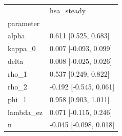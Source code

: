 \begin{tabular}{ll}
\toprule
 & hsa\_steady \\
parameter &  \\
\midrule
alpha & 0.611 [0.525, 0.683] \\
kappa\_0 & 0.007 [-0.093, 0.099] \\
delta & 0.008 [-0.025, 0.026] \\
rho\_1 & 0.537 [0.249, 0.822] \\
rho\_2 & -0.192 [-0.545, 0.061] \\
phi\_1 & 0.958 [0.903, 1.011] \\
lambda\_ez & 0.071 [-0.115, 0.246] \\
n & -0.045 [-0.098, 0.018] \\
\bottomrule
\end{tabular}
